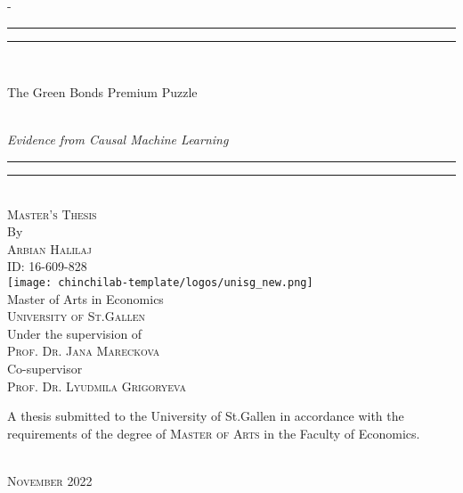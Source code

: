 %
%

\begin{titlingpage}
\begin{SingleSpace}
\calccentering{\unitlength} 
\begin{adjustwidth*}{\unitlength}{-\unitlength}
\vspace*{1mm}
\begin{center}
\rule[0.5ex]{\linewidth}{2pt}\vspace*{-\baselineskip}\vspace*{3.2pt}
\rule[0.5ex]{\linewidth}{1pt}\\[\baselineskip]
{\HUGE \color{citecolour} The Green Bonds Premium Puzzle \par}\\[4mm]
{\Large \textit{Evidence from Causal Machine Learning}}\\
\rule[0.5ex]{\linewidth}{1pt}\vspace*{-\baselineskip}\vspace{3.2pt}
\rule[0.5ex]{\linewidth}{2pt}\\
\vspace{6.5mm}
{\large \textsc{Master's Thesis}}\\
\vspace{6.5mm}
{\large By}\\
\vspace{6.5mm}
{\large\textsc{Arbian Halilaj}\\
ID: 16-609-828}\\
\vspace{6mm}
\texttt{[image: chinchilab-template/logos/unisg\_new.png]}\\
\vspace{6mm}
{\large Master of Arts in Economics\\
\textsc{University of St.Gallen}}\\
\vspace{6mm}
{\large Under the supervision of \\
\textsc{Prof. Dr. Jana Mareckova}}\\
\vspace{6mm}
{\large Co-supervisor \\
\textsc{Prof. Dr. Lyudmila Grigoryeva}}\\
\vspace{9mm}
\begin{minipage}{10cm}
A thesis submitted to the University of St.Gallen in accordance with the requirements of the degree of \textsc{Master of Arts} in the Faculty of Economics.
\end{minipage}\\
\vspace{9mm}
{\large\textsc{November 2022}}
\vspace{12mm}
\end{center}
\end{adjustwidth*}
\end{SingleSpace}
\end{titlingpage}